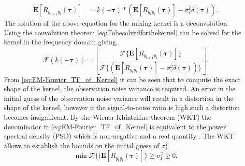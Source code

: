 \documentclass[10pt,twocolumn,twoside]{IEEEtran}
\begin{document}
 \begin{align}\label{eq:Tobesolvedforthekernel}
	\mathbf{E}[R_{y_{t+1}y_t}(\boldsymbol{\tau})] &= k(-\boldsymbol\tau) \ast \left(\mathbf{E}[ R_{y_ty_t}(\boldsymbol{\tau})] - \sigma_{\varepsilon}^2 \delta(\boldsymbol{\tau})\right).
\end{align} 
The solution of the above equation for the mixing kernel is a deconvolution. Using the convolution theorem \eqref{eq:Tobesolvedforthekernel} can be solved for the kernel in the frequency domain giving,
\begin{equation}\label{eq:EM-Fourier_TF_of_Kernel}
	\mathcal{F}\left(k(-\boldsymbol\tau)\right) = \left[\frac{\mathcal{F}\{\mathbf{E}[R_{y_{t+1}y_t}(\boldsymbol{\tau})]\}}{\mathcal{F}\{(\mathbf{E}\left[R_{y_ty_t}(\boldsymbol\tau)\right] - \sigma_{\varepsilon}^2 \delta(\boldsymbol\tau))\}}\right].
\end{equation}
From \eqref{eq:EM-Fourier_TF_of_Kernel} it can be seen that to compute the exact shape of the kernel, the observation noise variance is required. An error in the initial guess of  the observation noise variance will result in a distortion in the shape of the kernel, however if the signal-to-noise ratio is high such a distortion becomes insignificant.
By the Wiener-Khintchine theorem (WKT) the denominator in \eqref{eq:EM-Fourier_TF_of_Kernel} is equivalent to the power spectral density (PSD) which is non-negative and a real quantity \cite{Ricker2003}. The WKT allows to establish the bounds on the initial guess of $\sigma_{\varepsilon}^2$
\begin{equation}\label{eq:BoundOnObsVariance}   
  \min\mathcal{F}\{(\mathbf{E}\left[R_{y_ty_t}(\boldsymbol\tau)\right]\}\ge\sigma_{\varepsilon}^2\ge0. 
\end{equation} 
\end{document}

